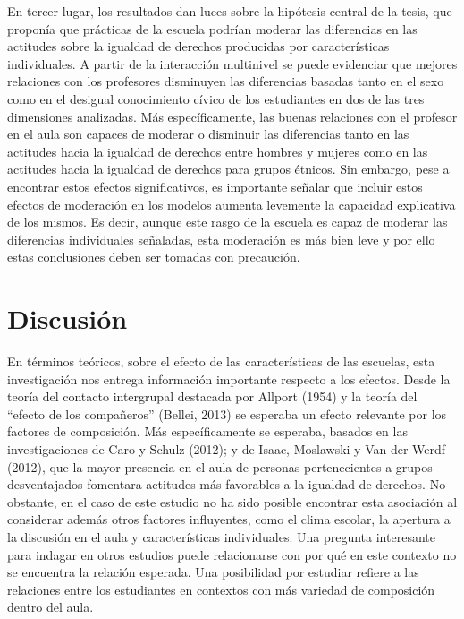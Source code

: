 \documentclass[12pt,twoside]{templates/facsothesis}
\begin{document}
En tercer lugar, los resultados dan luces sobre la hipótesis central de la tesis, que proponía que prácticas de la escuela podrían moderar las diferencias en las actitudes sobre la igualdad de derechos producidas por características individuales. A partir de la interacción multinivel se puede evidenciar que mejores relaciones con los profesores disminuyen las diferencias basadas tanto en el sexo como en el desigual conocimiento cívico de los estudiantes en dos de las tres dimensiones analizadas. Más específicamente, las buenas relaciones con el profesor en el aula son capaces de moderar o disminuir las diferencias tanto en las actitudes hacia la igualdad de derechos entre hombres y mujeres como en las actitudes hacia la igualdad de derechos para grupos étnicos. Sin embargo, pese a encontrar estos efectos significativos, es importante señalar que incluir estos efectos de moderación en los modelos aumenta levemente la capacidad explicativa de los mismos. Es decir, aunque este rasgo de la escuela es capaz de moderar las diferencias individuales señaladas, esta moderación es más bien leve y por ello estas conclusiones deben ser tomadas con precaución.

\hypertarget{discusiuxf3n}{%
\section{Discusión}\label{discusiuxf3n}}

En términos teóricos, sobre el efecto de las características de las escuelas, esta investigación nos entrega información importante respecto a los efectos. Desde la teoría del contacto intergrupal destacada por Allport (1954) y la teoría del ``efecto de los compañeros'' (Bellei, 2013) se esperaba un efecto relevante por los factores de composición. Más específicamente se esperaba, basados en las investigaciones de Caro y Schulz (2012); y de Isaac, Moslawski y Van der Werdf (2012), que la mayor presencia en el aula de personas pertenecientes a grupos desventajados fomentara actitudes más favorables a la igualdad de derechos. No obstante, en el caso de este estudio no ha sido posible encontrar esta asociación al considerar además otros factores influyentes, como el clima escolar, la apertura a la discusión en el aula y características individuales. Una pregunta interesante para indagar en otros estudios puede relacionarse con por qué en este contexto no se encuentra la relación esperada. Una posibilidad por estudiar refiere a las relaciones entre los estudiantes en contextos con más variedad de composición dentro del aula.
\end{document}
